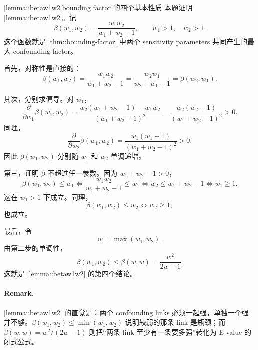 \begin{exercisesolution}{\cref{lemma::betaw1w2}}{bounding factor 的四个基本性质}
本题证明 \cref{lemma::betaw1w2}。记
\[
\beta(w_1,w_2)=\frac{w_1w_2}{w_1+w_2-1},
\qquad w_1>1,\quad w_2>1.
\]
这个函数就是 \cref{thm::bounding-factor} 中两个 sensitivity parameters 共同产生的最大 confounding factor。

首先，对称性是直接的：
\[
\beta(w_1,w_2)
=\frac{w_1w_2}{w_1+w_2-1}
=\frac{w_2w_1}{w_2+w_1-1}
=\beta(w_2,w_1).
\]

其次，分别求偏导。对 $w_1$，
\[
\frac{\partial}{\partial w_1}\beta(w_1,w_2)
=
\frac{w_2(w_1+w_2-1)-w_1w_2}{(w_1+w_2-1)^2}
=
\frac{w_2(w_2-1)}{(w_1+w_2-1)^2}>0.
\]
同理，
\[
\frac{\partial}{\partial w_2}\beta(w_1,w_2)
=
\frac{w_1(w_1-1)}{(w_1+w_2-1)^2}>0.
\]
因此 $\beta(w_1,w_2)$ 分别随 $w_1$ 和 $w_2$ 单调递增。

第三，证明 $\beta$ 不超过任一参数。因为 $w_1+w_2-1>0$，
\[
\beta(w_1,w_2)\leq w_1
\Longleftrightarrow
\frac{w_1w_2}{w_1+w_2-1}\leq w_1
\Longleftrightarrow
w_2\leq w_1+w_2-1
\Longleftrightarrow
w_1\geq 1.
\]
这在 $w_1>1$ 下成立。同理，
\[
\beta(w_1,w_2)\leq w_2
\Longleftrightarrow
w_2\geq 1,
\]
也成立。

最后，令
\[
w=\max(w_1,w_2).
\]
由第二步的单调性，
\[
\beta(w_1,w_2)\leq \beta(w,w)=\frac{w^2}{2w-1}.
\]
这就是 \cref{lemma::betaw1w2} 的第四个结论。

\paragraph{Remark.}
\cref{lemma::betaw1w2} 的直觉是：两个 confounding links 必须一起强，单独一个强并不够。$\beta(w_1,w_2)\leq \min(w_1,w_2)$ 说明较弱的那条 link 是瓶颈；而 $\beta(w,w)=w^2/(2w-1)$ 则把``两条 link 至少有一条要多强''转化为 E-value 的闭式公式。
\end{exercisesolution}

